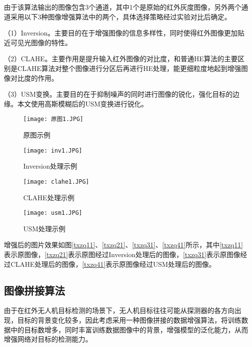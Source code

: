 由于该算法输出的图像包含3个通道，其中1个是原始的红外灰度图像，另外两个通道采用以下3种图像增强算法中的两个，具体选择策略经过实验对比后确定。

（1）Inversion。主要目的在于增强图像的信息多样性，同时使得红外图像更加贴近可见光图像的特性。

（2）CLAHE。主要作用是提升输入红外图像的对比度，和普通HE算法的主要区别是CLAHE算法对整个图像进行分区后再进行HE处理，能更细粒度地起到增强图像对比度的作用。

（3）USM变换。主要目的在于抑制噪声的同时进行图像的锐化，强化目标的边缘。本文使用高斯模糊后的USM变换进行锐化。

\begin{figure}[htbp]
	\centering
	\begin{minipage}{0.49\linewidth}
		\centering
		\texttt{[image: 原图1.JPG]}
		\caption{原图示例}
		\label{txzq11}%
	\end{minipage}
	\begin{minipage}{0.49\linewidth}
		\centering
		\texttt{[image: inv1.JPG]}
		\caption{Inversion处理示例}
		\label{txzq21}%
	\end{minipage}
	
	\begin{minipage}{0.49\linewidth}
		\centering
		\texttt{[image: clahe1.JPG]}
		\caption{CLAHE处理示例}
		\label{txzq31}%
	\end{minipage}
	\begin{minipage}{0.49\linewidth}
		\centering
		\texttt{[image: usm1.JPG]}
		\caption{USM处理示例}
		\label{txzq41}%
	\end{minipage}
  \label{txzq}
\end{figure}

增强后的图片效果如图\ref{txzq11}、\ref{txzq21}、\ref{txzq31}、\ref{txzq41}所示，其中\ref{txzq11}表示原图像，\ref{txzq21}表示原图经过Inversion处理后的图像，\ref{txzq31}表示原图像经过CLAHE处理后的图像，\ref{txzq41}表示原图像经过USM处理后的图像。

\subsection{图像拼接算法}
由于在红外无人机目标检测的场景下，无人机目标往往可能从探测器的各方向出现，目标的背景变化较多，因此考虑采用一种图像拼接的数据增强算法，将训练数据中的目标数增多，同时丰富训练数据图像中的背景，增强模型的泛化能力，从而增强网络对目标的检测能力。

